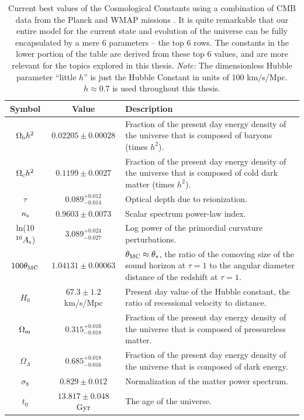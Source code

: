 \begin{table}%
 \begin{center}
    \begin{tabular}{|c|c|p{10cm}|}

      \hline
      Symbol & Value & Description \\ \hline \hline

      $\Omega_{\rm b}h^2$ & $0.02205\pm0.00028$ & Fraction of the present day energy density of the universe that is composed of baryons (times $h^2$). \\ \hline
      $\Omega_{\rm c}h^2$ & $0.1199\pm0.0027$ & Fraction of the present day energy density of the universe that is composed of cold dark matter (times $h^2$). \\ \hline
      $\tau$ & $0.089^{+0.012}_{-0.014}$ & Optical depth due to reionization. \\ \hline
      $n_{\rm s}$ & $0.9603\pm0.0073$ & Scalar spectrum power-law index. \\ \hline
      ln(10$^{10}A_{\rm s}$) & $3.089^{+0.024}_{-0.027}$ & Log power of the primordial curvature perturbations. \\ \hline 
      $100\theta_{\rm MC}$ & $1.04131\pm0.00063$ & $\theta_{\rm MC} \approx \theta_*$, the ratio of the comoving size of the sound horizon at $\tau=1$ to the angular diameter distance of the redshift at $\tau=1$. \\ \hline \hline

      $H_0$ & $67.3\pm1.2$ km/s/Mpc & Present day value of the Hubble constant, the ratio of recessional velocity to distance. \\ \hline
      $\Omega_{\rm m}$ & $0.315^{+0.016}_{-0.018}$ & Fraction of the present day energy density of the universe that is composed of pressureless matter. \\ \hline
      $\Omega_{\Lambda}$ & $0.685^{+0.018}_{-0.016}$ & Fraction of the present day energy density of the universe that is composed of dark energy. \\ \hline
      $\sigma_8$ & $0.829\pm0.012$ & Normalization of the matter power spectrum. \\ \hline
      $t_0$ & $13.817\pm0.048$ Gyr & The age of the universe. \\ \hline

    \end{tabular}
  \caption[Cosmological Constants]{Current best values of the Cosmological Constants using a combination of \ac{CMB} data from the Planck and \ac{WMAP} missions \citep{PlanckXVI}. It is quite remarkable that our entire model for the current state and evolution of the universe can be fully encapsulated by a mere 6 parameters -- the top 6 rows. The constants in the lower portion of the table are derived from these top 6 values, and are more relevant for the topics explored in this thesis. {\it Note: }The dimensionless Hubble parameter ``little $h$'' is just the Hubble Constant in units of 100 km/s/Mpc. $h \approx 0.7$ is used throughout this thesis.}
  \label{table:constants}

 \end{center}
\end{table}


